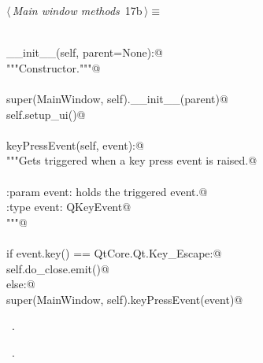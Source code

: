 \documentclass[
    a4paper,      %
    10pt,         %
    openright,    %
    notitlepage,  %
    parskip=half, %
]{scrreprt}       %
\theoremstyle{definition}                    %
\begin{document}
\begin{flushleft} \small
\begin{minipage}{\linewidth}\label{scrap7}\raggedright\small
{} $\langle\,${\itshape Main window methods}\nobreak\ {\footnotesize {17b}}$\,\rangle\equiv$
\vspace{-1ex}
\begin{list}{}{} \item
\mbox{}\lstinline@@\\
\mbox{}\lstinline@def __init__(self, parent=None):@\\
\mbox{}\lstinline@    """Constructor."""@\\
\mbox{}\lstinline@@\\
\mbox{}\lstinline@    super(MainWindow, self).__init__(parent)@\\
\mbox{}\lstinline@    self.setup_ui()@\\
\mbox{}\lstinline@@\\
\mbox{}\lstinline@def keyPressEvent(self, event):@\\
\mbox{}\lstinline@    """Gets triggered when a key press event is raised.@\\
\mbox{}\lstinline@@\\
\mbox{}\lstinline@    :param event: holds the triggered event.@\\
\mbox{}\lstinline@    :type  event: QKeyEvent@\\
\mbox{}\lstinline@    """@\\
\mbox{}\lstinline@@\\
\mbox{}\lstinline@    if event.key() == QtCore.Qt.Key_Escape:@\\
\mbox{}\lstinline@        self.do_close.emit()@\\
\mbox{}\lstinline@    else:@\\
\mbox{}\lstinline@        super(MainWindow, self).keyPressEvent(event)@\\
\mbox{}\lstinline@@{\NWsep}
\end{list}
\vspace{-1.5ex}
\footnotesize
\begin{list}{}{\setlength{\itemsep}{-\parsep}\setlength{\itemindent}{-\leftmargin}}
\item \NWtxtMacroDefBy\ .
\item \NWtxtMacroRefIn\ .

\item{}
\end{list}
\end{minipage}\vspace{4ex}
\end{flushleft}
\end{document}
